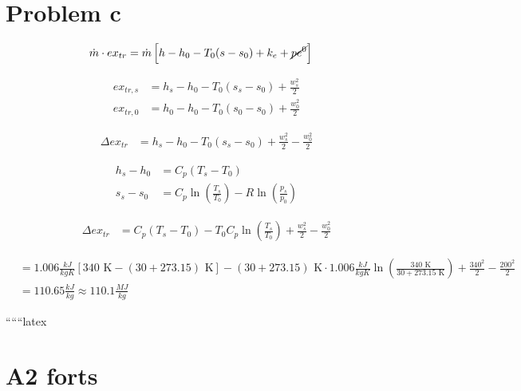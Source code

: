 \section*{Problem c}

\begin{align*}
\dot{m} \cdot ex_{tr} &= \dot{m} \left[ h - h_0 - T_0 (s - s_0) + k_e + \cancel{pe^0} \right]
\end{align*}

\begin{align*}
ex_{tr,s} &= h_s - h_0 - T_0 (s_s - s_0) + \frac{w_s^2}{2} \\
ex_{tr,0} &= h_0 - h_0 - T_0 (s_0 - s_0) + \frac{w_0^2}{2}
\end{align*}

\begin{align*}
\Delta ex_{tr} &= h_s - h_0 - T_0 (s_s - s_0) + \frac{w_s^2}{2} - \frac{w_0^2}{2}
\end{align*}

\begin{align*}
h_s - h_0 &= C_p (T_s - T_0) \\
s_s - s_0 &= C_p \ln \left( \frac{T_s}{T_0} \right) - R \ln \left( \frac{p_s}{p_0} \right)
\end{align*}

\begin{align*}
\Delta ex_{tr} &= C_p (T_s - T_0) - T_0 C_p \ln \left( \frac{T_s}{T_0} \right) + \frac{w_s^2}{2} - \frac{w_0^2}{2}
\end{align*}

\begin{align*}
&= 1.006 \frac{kJ}{kg K} \left[ 340 \text{ K} - (30 + 273.15) \text{ K} \right] - (30 + 273.15) \text{ K} \cdot 1.006 \frac{kJ}{kg K} \ln \left( \frac{340 \text{ K}}{30 + 273.15 \text{ K}} \right) + \frac{340^2}{2} - \frac{200^2}{2} \\
&= 110.65 \frac{kJ}{kg} \approx 110.1 \frac{MJ}{kg}
\end{align*}

``````latex


\section*{A2 forts}
